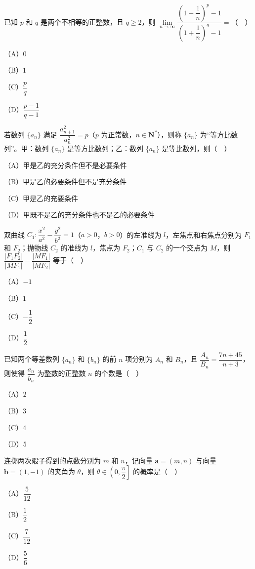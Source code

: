 \begin{question}
已知 $p$ 和 $q$ 是两个不相等的正整数，且 $q\geqslant2$，则 $\lim\limits_{n\to\infty}\dfrac{\left(1+\dfrac1n\right)^p-1}{\left(1+\dfrac1n\right)^q-1}=$（　）

（A）$0$

（B）$1$

（C）$\dfrac pq$

（D）$\dfrac{p-1}{q-1}$

\end{question}
\begin{question}
若数列 $\{a_n\}$ 满足 $\dfrac{a_{n+1}^2}{a_n^2}=p$（$p$ 为正常数，$n\in\mathbf N^*$），则称 $\{a_n\}$ 为“等方比数列”。甲：数列 $\{a_n\}$ 是等方比数列；乙：数列 $\{a_n\}$ 是等比数列，则（　）

（A）甲是乙的充分条件但不是必要条件

（B）甲是乙的必要条件但不是充分条件

（C）甲是乙的充要条件

（D）甲既不是乙的充分条件也不是乙的必要条件

\end{question}
\begin{question}
双曲线 $C_1:\dfrac{x^2}{a^2}-\dfrac{y^2}{b^2}=1$（$a>0$，$b>0$）的左准线为 $l$，左焦点和右焦点分别为 $F_1$ 和 $F_2$；抛物线 $C_2$ 的准线为 $l$，焦点为 $F_2$；$C_1$ 与 $C_2$ 的一个交点为 $M$，则 $\dfrac{|F_1F_2|}{|MF_1|}-\dfrac{|MF_1|}{|MF_2|}$ 等于（　）

（A）$-1$

（B）$1$

（C）$-\dfrac12$

（D）$\dfrac12$

\end{question}
\begin{question}
已知两个等差数列 $\{a_n\}$ 和 $\{b_n\}$ 的前 $n$ 项分别为 $A_n$ 和 $B_n$，且 $\dfrac{A_n}{B_n}=\dfrac{7n+45}{n+3}$，则使得 $\dfrac{a_n}{b_n}$ 为整数的正整数 $n$ 的个数是（　）

（A）$2$

（B）$3$

（C）$4$

（D）$5$

\end{question}
\begin{question}
连掷两次骰子得到的点数分别为 $m$ 和 $n$，记向量 $\boldsymbol a=(m,n)$ 与向量 $\boldsymbol b=(1,-1)$ 的夹角为 $\theta$，则 $\theta\in\left(0,\dfrac{\pi}2\right]$ 的概率是（　）

（A）$\dfrac5{12}$

（B）$\dfrac12$

（C）$\dfrac7{12}$

（D）$\dfrac56$

\end{question}
